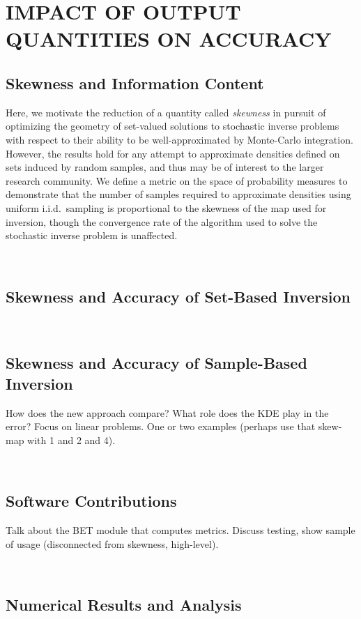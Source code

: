 \chapter{\uppercase{Impact of Output Quantities on Accuracy} \label{chapter:03}}

\section{Skewness and Information Content}
Here, we motivate the reduction of a quantity called \emph{skewness} in pursuit of optimizing the geometry of set-valued solutions to stochastic inverse problems with respect to their ability to be well-approximated by Monte-Carlo integration. 
However, the results hold for any attempt to approximate densities defined on sets induced by random samples, and thus may be of interest to the larger research community. 
We define a metric on the space of probability measures to demonstrate that the number of samples required to approximate densities using uniform i.i.d.~sampling is proportional to the skewness of the map used for inversion, though the convergence rate of the algorithm used to solve the stochastic inverse problem is unaffected. 

\
\section{Skewness and Accuracy of Set-Based Inversion}


\
\section{Skewness and Accuracy of Sample-Based Inversion}

How does the new approach compare? What role does the KDE play in the error?
Focus on linear problems. One or two examples (perhaps use that skew-map with 1 and 2 and 4).

\
\section{Software Contributions}

Talk about the BET module that computes metrics.
Discuss testing, show sample of usage (disconnected from skewness, high-level).

\
\section{Numerical Results and Analysis}

